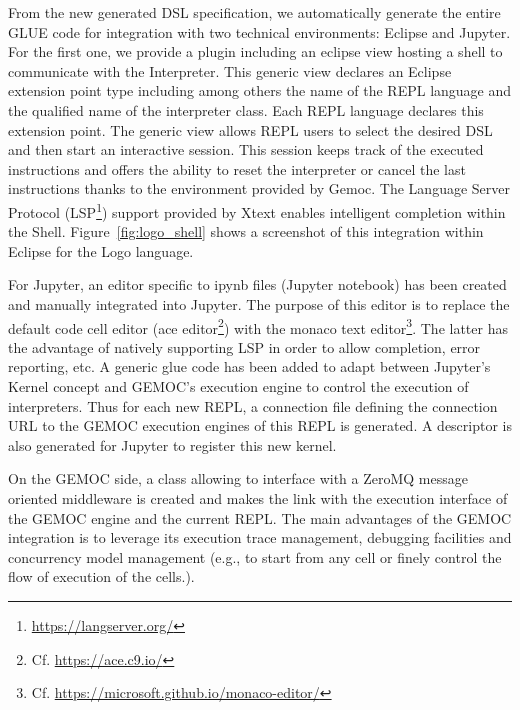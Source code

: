 From the new generated DSL specification, we automatically generate the entire GLUE code for integration with two technical environments: Eclipse and Jupyter. 
For the first one, we provide a plugin including an eclipse view hosting a shell to communicate with the Interpreter.  This generic view declares an Eclipse extension point type including among others the name of the REPL language and the qualified name of the interpreter class. 
Each REPL language declares this extension point. The generic view allows REPL users to select the desired DSL and then start an interactive session. This session keeps track of the executed instructions and offers the ability to reset the interpreter or cancel the last instructions thanks to the environment provided by Gemoc. The Language Server Protocol (LSP\footnote{\url{https://langserver.org/}}) support provided by Xtext enables intelligent completion within the Shell. Figure~\ref{fig:logo_shell} shows a screenshot of this integration within Eclipse for the Logo language. 

For Jupyter, an editor specific to ipynb files (Jupyter notebook) has been created and manually integrated into Jupyter. The purpose of this editor is to replace the default code cell editor (ace editor\footnote{Cf. \url{https://ace.c9.io/}}) with the monaco text editor\footnote{Cf. \url{https://microsoft.github.io/monaco-editor/}}. The latter has the advantage of natively supporting LSP in order to allow completion, error reporting, etc. A generic glue code has been added to adapt between Jupyter's Kernel concept and GEMOC's execution engine to control the execution of interpreters. Thus for each new REPL, a connection file defining the connection URL to the GEMOC execution engines of this REPL is generated. A descriptor is also generated for Jupyter to register this new kernel. 

On the GEMOC side, a class allowing to interface with a ZeroMQ message oriented middleware is created and makes the link with the execution interface of the GEMOC engine and the current REPL. The main advantages of the GEMOC integration is to leverage its execution trace management, debugging facilities and concurrency model management (e.g., to start from any cell or finely control the flow of execution of the cells.).



